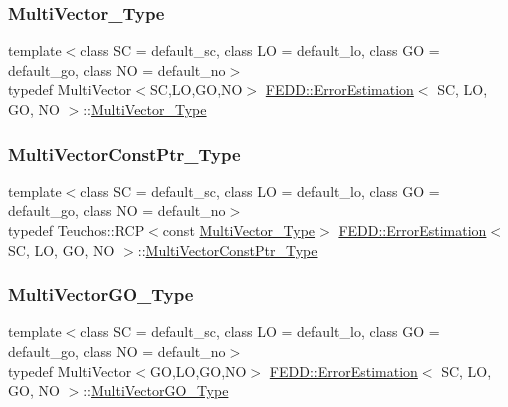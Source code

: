 \subsubsection{\texorpdfstring{Multi\+Vector\+\_\+\+Type}{MultiVector\_Type}}
{\footnotesize\ttfamily template$<$class SC = default\+\_\+sc, class LO = default\+\_\+lo, class GO = default\+\_\+go, class NO = default\+\_\+no$>$ \\
typedef Multi\+Vector$<$SC,LO,GO,NO$>$ \hyperlink{classFEDD_1_1ErrorEstimation}{F\+E\+D\+D\+::\+Error\+Estimation}$<$ SC, LO, GO, NO $>$\+::\hyperlink{classFEDD_1_1ErrorEstimation_a1c6fa9610a1e5e887e5a88ab33f1c792}{Multi\+Vector\+\_\+\+Type}}

\mbox{\label{classFEDD_1_1ErrorEstimation_a577235ef4fd7efda312b8e2482617988}} 
\subsubsection{\texorpdfstring{Multi\+Vector\+Const\+Ptr\+\_\+\+Type}{MultiVectorConstPtr\_Type}}
{\footnotesize\ttfamily template$<$class SC = default\+\_\+sc, class LO = default\+\_\+lo, class GO = default\+\_\+go, class NO = default\+\_\+no$>$ \\
typedef Teuchos\+::\+R\+CP$<$const \hyperlink{classFEDD_1_1ErrorEstimation_a1c6fa9610a1e5e887e5a88ab33f1c792}{Multi\+Vector\+\_\+\+Type}$>$ \hyperlink{classFEDD_1_1ErrorEstimation}{F\+E\+D\+D\+::\+Error\+Estimation}$<$ SC, LO, GO, NO $>$\+::\hyperlink{classFEDD_1_1ErrorEstimation_a577235ef4fd7efda312b8e2482617988}{Multi\+Vector\+Const\+Ptr\+\_\+\+Type}}

\mbox{\label{classFEDD_1_1ErrorEstimation_a450a5b3954044f55167783097b934bbd}} 
\subsubsection{\texorpdfstring{Multi\+Vector\+G\+O\+\_\+\+Type}{MultiVectorGO\_Type}}
{\footnotesize\ttfamily template$<$class SC = default\+\_\+sc, class LO = default\+\_\+lo, class GO = default\+\_\+go, class NO = default\+\_\+no$>$ \\
typedef Multi\+Vector$<$GO,LO,GO,NO$>$ \hyperlink{classFEDD_1_1ErrorEstimation}{F\+E\+D\+D\+::\+Error\+Estimation}$<$ SC, LO, GO, NO $>$\+::\hyperlink{classFEDD_1_1ErrorEstimation_a450a5b3954044f55167783097b934bbd}{Multi\+Vector\+G\+O\+\_\+\+Type}}

